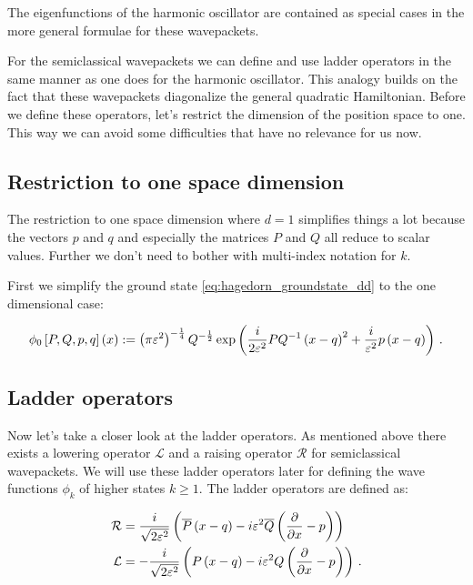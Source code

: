 The eigenfunctions of the harmonic oscillator are contained as special cases
in the more general formulae for these wavepackets.

For the semiclassical wavepackets we can define and use ladder operators in the
same manner as one does for the harmonic oscillator. This analogy builds on the fact that
these wavepackets diagonalize the general quadratic Hamiltonian. Before we define
these operators, let's restrict the dimension of the position space to one. This
way we can avoid some difficulties that have no relevance for us now.

\subsection{Restriction to one space dimension}

The restriction to one space dimension where $d=1$ simplifies things a lot because
the vectors $p$ and $q$ and especially the matrices $P$ and $Q$ all reduce to scalar
values. Further we don't need to bother with multi-index notation for $k$.

First we simplify the ground state \eqref{eq:hagedorn_groundstate_dd} to the one
dimensional case:

\begin{equation} \label{eq:hagedorn_groundstate_1d}
  \phi_0 \left[ P,Q,p,q \right] \left( x \right)
  :=
  \left(\pi\varepsilon^2\right)^{-\frac{1}{4}} Q^{-\frac{1}{2}}
  \exp \left(
      \frac{i}{2\varepsilon^2} PQ^{-1}\left(x-q\right)^2
      + \frac{i}{\varepsilon^2} p\left(x-q\right)
  \right) \,.
\end{equation}

\subsection{Ladder operators}

Now let's take a closer look at the ladder operators. As mentioned above there
exists a lowering operator $\mathcal{L}$ and a raising operator $\mathcal{R}$
for semiclassical wavepackets. We will use these ladder operators later for
defining the wave functions $\phi_k$ of higher states $k \geq 1$. The ladder
operators are defined as:

\begin{equation} \label{eq:definition_ladder_ops}
\begin{split}
  \mathcal{R} & =  \frac{i}{\sqrt{2\varepsilon^2}} \left( \overline{P} \left(x-q\right) - i \varepsilon^2 \overline{Q} \left( \frac{\partial}{\partial x}-p\right) \right) \\
  \mathcal{L} & = -\frac{i}{\sqrt{2\varepsilon^2}} \left( P \left(x-q\right) - i \varepsilon^2 Q \left( \frac{\partial}{\partial x}-p\right) \right) \,.
\end{split}
\end{equation}

